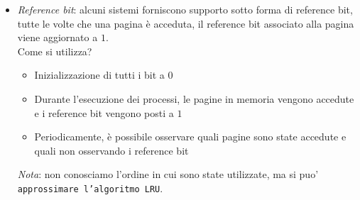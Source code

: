 \documentclass[a4paper,12pt]{article}
\begin{document}
\begin{itemize}
\begin{itemize}
    \item \textit{Reference bit}: alcuni sistemi forniscono supporto sotto forma di reference bit, tutte le volte che una pagina è acceduta, il reference bit associato alla pagina viene aggiornato a $1$.
    \vspace{5px}\\Come si utilizza? 
    \begin{itemize}
      \item Inizializzazione di tutti i bit a $0$
      \item Durante l'esecuzione dei processi, le pagine in memoria vengono accedute e i reference bit vengono posti a $1$
      \item Periodicamente, è possibile osservare quali pagine sono state accedute e quali non osservando i reference bit
    \end{itemize}
    \textit{Nota}: non conosciamo l'ordine in cui sono state utilizzate, ma si puo' \texttt{approssimare l'algoritmo LRU}.\\

\end{itemize}
\end{itemize}
\end{document}
